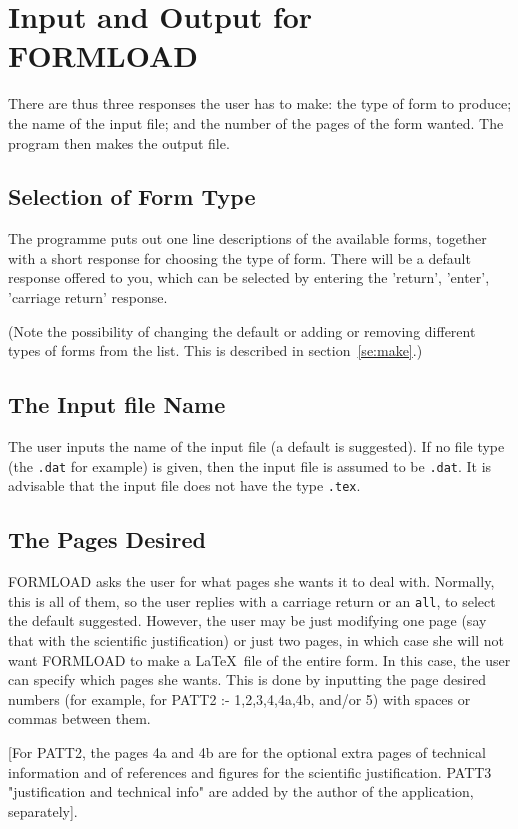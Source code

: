 \section{Input and Output for FORMLOAD }

There are thus three responses the user has to make: the type of form to
produce; the name of the input file; and the number of the pages of the
form wanted. The program then makes the output file. 

\subsection{Selection of Form Type}

The programme puts out one line descriptions of the available forms, together
with a short response for choosing the type of form. There will be a 
default response offered to you, which can be selected by entering the
'return', 'enter', 'carriage return' response.

(Note the possibility of changing the default or adding or removing
different types of forms from the list. This is described in 
section~\ref{se:make}.)

\subsection{The Input file Name}

The user inputs the name of the input file (a default is suggested). If no
file type (the {\tt .dat} for example) is given, then the input file is
assumed to be {\tt .dat}. It is advisable that the input file does not have
the type {\tt .tex}. 

\subsection{The Pages Desired}

FORMLOAD asks the user for what pages she wants it to deal with.
Normally, this is all of them, so the user replies with a carriage return or
an {\tt all}, to select the default suggested. However, the user may be just
modifying one page (say that with the scientific justification) or just two
pages, in which case she will not want FORMLOAD to make a \LaTeX\
file of the entire form. In this case, the user can specify which pages she
wants. This is done by inputting the page desired numbers (for example, for
PATT2 :- 1,2,3,4,4a,4b, and/or 5) with spaces or commas between them.

[For PATT2, the pages 4a and 4b are for the optional extra pages
of technical information and of references and figures for the scientific
justification. PATT3 "justification and technical info" are added by the
author of the application, separately]. 

